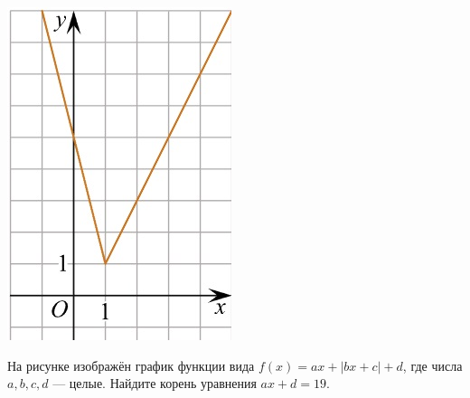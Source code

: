 \begin{class}[number=5]
\begin{listofex}
\begin{minipage}[c]{0.1\textwidth}
			\includegraphics[align=t, width=\textwidth]{pics/G101M4C5-6.jpg}
		\end{minipage}
		\item
		\begin{minipage}[t]{0.43\textwidth}
			На рисунке изображён график функции вида \(f(x)=ax+|bx+c|+d\), где числа \(a, b, c, d\) --- целые. Найдите корень уравнения \(ax+d=19\).
		\end{minipage}
		\begin{minipage}[c]{0.1\textwidth}

\end{minipage}
\end{listofex}
\end{class}
